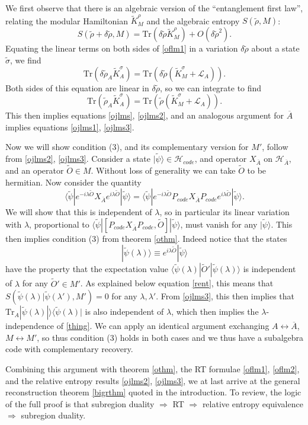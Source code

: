 \documentclass[12pt]{article}
\newcommand{\be}{\begin{equation}}
\newcommand{\ee}{\end{equation}}
\newcommand{\lan}{\langle}
\newcommand{\ran}{\rangle}
\newcommand{\Tr}{\mathrm{Tr}}
\newcommand{\wt}{\widetilde}
\newcommand{\Ll}{\mathcal{L}}
\newcommand{\HAb}{\mathcal{H}_{\ol{A}}}
\newcommand{\Ab}{\ol{A}}
\newcommand{\Hc}{\mathcal{H}_{code}}
\newcommand{\LA}{\Ll_A}
\newcommand{\ol}{\overline}
\newcommand{\Pc}{P_{code}}
\begin{document}
We first observe that there is an algebraic version of the  ``entanglement first law'', relating the modular Hamiltonian $\wt{K}^\rho_M$ and the algebraic entropy $S(\wt{\rho},M)$:
\be
S(\wt{\rho}+\delta\wt{\rho},M)=\Tr \left(\delta\wt{\rho}\wt{K}^\rho_M\right)+O\left(\delta\wt{\rho}^2\right).
\ee
Equating the linear terms on both sides of \eqref{oflm1} in a variation $\delta \wt{\rho}$ about a state $\wt{\sigma}$, we find
\be
\Tr\left(\delta \wt{\rho}_A\wt{K}^\sigma_A\right)=\Tr\left(\delta \wt{\rho}\left(\wt{K}_M^\sigma+\LA\right)\right).
\ee
Both sides of this equation are linear in $\delta\wt{\rho}$, so we can integrate to find
\be
\Tr\left(\wt{\rho}_A\wt{K}^\sigma_A\right)=\Tr\left(\wt{\rho}\left(\wt{K}_M^\sigma+\LA\right)\right).
\ee
This then implies equations \eqref{ojlms}, \eqref{ojlms2}, and an analogous argument for $\Ab$ implies equations \eqref{ojlms1}, \eqref{ojlms3}.

Now we will show condition (3), and its complementary version for $M'$, follow from \eqref{ojlms2}, \eqref{ojlms3}.  Consider a state $|\wt{\psi}\ran \in \Hc$, and operator $X_{\Ab}$ on $\HAb$, and an operator $\wt{O}\in M$.  Without loss of generality we can take $\wt{O}$ to be hermitian.  Now consider the quantity 
\be
\lan \wt{\psi}|e^{-i\lambda \wt{O}} X_{\Ab} e^{i\lambda \wt{O}}|\wt{\psi}\ran=\lan \wt{\psi}|e^{-i\lambda \wt{O}} \Pc X_{\Ab} \Pc e^{i\lambda \wt{O}}|\wt{\psi}\ran.
\ee
We will show that this is independent of $\lambda$, so in particular its linear variation with $\lambda$, proportional to $\lan \wt{\psi}|[\Pc X_{\Ab}\Pc,\wt{O}]|\wt{\psi}\ran$, must vanish for any $|\wt{\psi}\ran$.  This then implies condition (3) from theorem \ref{othm}.  Indeed notice that the states 
\be\label{thing}
|\wt{\psi}(\lambda)\ran\equiv e^{i\lambda \wt{O}}|\wt{\psi}\ran
\ee
have the property that the expectation value $\lan \wt{\psi}(\lambda)|\wt{O}'|\wt{\psi}(\lambda)\ran$ is independent of $\lambda$ for any $\wt{O}'\in M'$.  As explained below equation \eqref{rent}, this means that $S(\wt{\psi}(\lambda)|\wt{\psi}(\lambda'),M')=0$ for any $\lambda, \lambda'$.  From \eqref{ojlms3}, this then implies that $\Tr_A|\wt{\psi}(\lambda)|\ran\lan\wt{\psi}(\lambda)|$ is also independent of $\lambda$, which then implies the $\lambda$-independence of \eqref{thing}.  We can apply an identical argument exchanging $A\leftrightarrow\Ab$, $M \leftrightarrow M'$, so thus condition (3) holds in both cases and we thus have a subalgebra code with complementary recovery.

Combining this argument with theorem \ref{othm},  the RT formulae \eqref{oflm1}, \eqref{oflm2}, and the relative entropy results \eqref{ojlms2}, \eqref{ojlms3}, we at last arrive at the general reconstruction theorem \ref{bigrthm} quoted in the introduction. To review, the logic of the full proof is that subregion duality $\Rightarrow$ RT $\Rightarrow$ relative entropy equivalence $\Rightarrow$ subregion duality.
\end{document}
